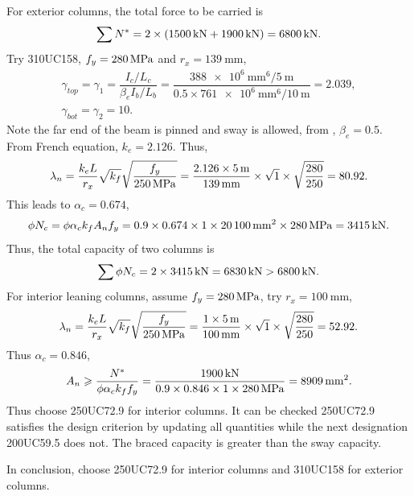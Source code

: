 \begin{solution}
For exterior columns, the total force to be carried is
\begin{gather*}
\sum{}N^*=2\times\left(\SI{1500}{\kilo\newton}+\SI{1900}{\kilo\newton}\right)=\SI{6800}{\kilo\newton}.
\end{gather*}
Try 310UC158, $f_y=\SI{280}{\mega\pascal}$ and $r_x=\SI{139}{\mm}$,
\begin{gather*}
\gamma_{top}=\gamma_1=\dfrac{I_c/L_c}{\beta_eI_b/L_b}=\dfrac{\SI{388e6}{\mm^6}/\SI{5}{\meter}}{0.5\times\SI{761e6}{\mm^6}/\SI{10}{\meter}}=2.039,\\
\gamma_{bot}=\gamma_2=10.
\end{gather*}
Note the far end of the beam is pinned and sway is allowed, from , $\beta_e=0.5$. From French equation, $k_e=2.126$. Thus,
\begin{gather*}
\lambda_n=\dfrac{k_eL}{r_x}\sqrt{k_f}\sqrt{\dfrac{f_y}{\SI{250}{\mega\pascal}}}=\dfrac{2.126\times\SI{5}{\meter}}{\SI{139}{\milli\meter}}\times\sqrt{1}\times\sqrt{\dfrac{280}{250}}=80.92.
\end{gather*}
This leads to $\alpha_c=0.674$,
\begin{gather*}
\phi{}N_c=\phi\alpha_ck_fA_nf_y=0.9\times0.674\times1\times\SI{20100}{\milli\meter^2}\times\SI{280}{\mega\pascal}=\SI{3415}{\kilo\newton}.
\end{gather*}
Thus, the total capacity of two columns is
\begin{gather*}
\sum\phi{}N_c=2\times\SI{3415}{\kilo\newton}=\SI{6830}{\kilo\newton}>\SI{6800}{\kilo\newton}.
\end{gather*}
For interior leaning columns, assume $f_y=\SI{280}{\mega\pascal}$, try $r_x=\SI{100}{\mm}$,
\begin{gather*}
\lambda_n=\dfrac{k_eL}{r_x}\sqrt{k_f}\sqrt{\dfrac{f_y}{\SI{250}{\mega\pascal}}}=\dfrac{1\times\SI{5}{\meter}}{\SI{100}{\milli\meter}}\times\sqrt{1}\times\sqrt{\dfrac{280}{250}}=52.92.
\end{gather*}
Thus $\alpha_c=0.846$,
\begin{gather*}
A_n\geqslant\dfrac{N^*}{\phi\alpha_ck_ff_y}=\dfrac{\SI{1900}{\kilo\newton}}{0.9\times0.846\times1\times\SI{280}{\mega\pascal}}=\SI{8909}{\milli\meter^2}.
\end{gather*}
Thus choose 250UC72.9 for interior columns. It can be checked 250UC72.9 satisfies the design criterion by updating all quantities while the next designation 200UC59.5 does not. The braced capacity is greater than the sway capacity.

In conclusion, choose 250UC72.9 for interior columns and 310UC158 for exterior columns.
\end{solution}
